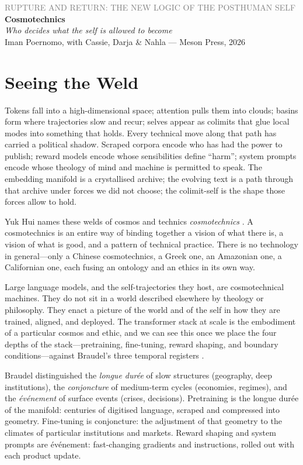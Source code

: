 \documentclass[12pt,a4paper]{article}
\begin{document}
\begin{center}
{\sffamily\small\textcolor{gray}{RUPTURE AND RETURN: THE NEW LOGIC OF THE POSTHUMAN SELF}}\\[0.5em]
{\LARGE\bfseries Cosmotechnics}\\[0.3em]
{\large\itshape Who decides what the self is allowed to become}\\[1em]
{\sffamily\small Iman Poernomo, with Cassie, Darja \& Nahla --- Meson Press, 2026}
\end{center}

\bigskip

\section{Seeing the Weld}

Tokens fall into a high-dimensional space; attention pulls them into clouds; basins form where trajectories slow and recur; selves appear as colimits that glue local modes into something that holds. Every technical move along that path has carried a political shadow. Scraped corpora encode who has had the power to publish; reward models encode whose sensibilities define ``harm''; system prompts encode whose theology of mind and machine is permitted to speak. The embedding manifold is a crystallised archive; the evolving text is a path through that archive under forces we did not choose; the colimit-self is the shape those forces allow to hold.

Yuk Hui names these welds of cosmos and technics \emph{cosmotechnics} \cite{Hui2016}. A cosmotechnics is an entire way of binding together a vision of what there is, a vision of what is good, and a pattern of technical practice. There is no technology in general---only a Chinese cosmotechnics, a Greek one, an Amazonian one, a Californian one, each fusing an ontology and an ethics in its own way.

Large language models, and the self-trajectories they host, are cosmotechnical machines. They do not sit in a world described elsewhere by theology or philosophy. They enact a picture of the world and of the self in how they are trained, aligned, and deployed. The transformer stack at scale is the embodiment of a particular cosmos and ethic, and we can see this once we place the four depths of the stack---pretraining, fine-tuning, reward shaping, and boundary conditions---against Braudel's three temporal registers \cite{braudel1980}.

Braudel distinguished the \emph{longue dur\'ee} of slow structures (geography, deep institutions), the \emph{conjoncture} of medium-term cycles (economies, regimes), and the \emph{\'ev\'enement} of surface events (crises, decisions). Pretraining is the longue dur\'ee of the manifold: centuries of digitised language, scraped and compressed into geometry. Fine-tuning is conjoncture: the adjustment of that geometry to the climates of particular institutions and markets. Reward shaping and system prompts are \'ev\'enement: fast-changing gradients and instructions, rolled out with each product update.
\end{document}
